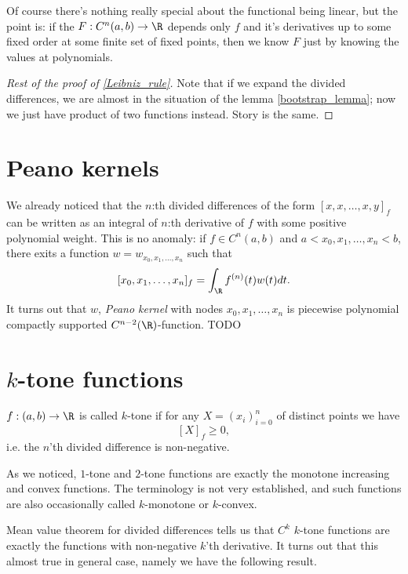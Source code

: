 Of course there's nothing really special about the functional being linear, but the point is: if the $F : C^{n}(a, b) \to \R$ depends only $f$ and it's derivatives up to some fixed order at some finite set of fixed points, then we know $F$ just by knowing the values at polynomials.

\begin{proof}[Rest of the proof of \ref{Leibniz_rule}]
	Note that if we expand the divided differences, we are almost in the situation of the lemma \ref{bootstrap_lemma}; now we just have product of two functions instead. Story is the same.
\end{proof}

\section{Peano kernels}

We already noticed that the $n$:th divided differences of the form $[x, x, \ldots, x, y]_{f}$ can be written as an integral of $n$:th derivative of $f$ with some positive polynomial weight. This is no anomaly: if $f \in C^{n}(a, b)$ and $a < x_{0}, x_{1}, \ldots, x_{n} < b$, there exits a function $w = w_{x_{0}, x_{1}, \ldots, x_{n}}$ such that
\[
	[x_{0}, x_{1}, \ldots, x_{n}]_{f} = \int_{\R} f^{(n)}(t) w(t) dt.
\]
It turns out that $w$, \textit{Peano kernel} with nodes $x_{0}, x_{1}, \ldots, x_{n}$ is piecewise polynomial compactly supported $C^{n - 2}(\R)$-function. TODO

\section{$k$-tone functions}

\begin{maar}
	$f : (a, b) \to \R$ is called $k$-tone if for any $X = (x_{i})_{i = 0}^{n}$ of distinct points we have
	\[
		[X]_{f} \geq 0,
	\]
	i.e. the $n$'th divided difference is non-negative.
\end{maar}

As we noticed, $1$-tone and $2$-tone functions are exactly the monotone increasing and convex functions. The terminology is not very established, and such functions are also occasionally called $k$-monotone or $k$-convex.

Mean value theorem for divided differences tells us that $C^{k}$ $k$-tone functions are exactly the functions with non-negative $k$'th derivative. It turns out that this almost true in general case, namely we have the following result.

